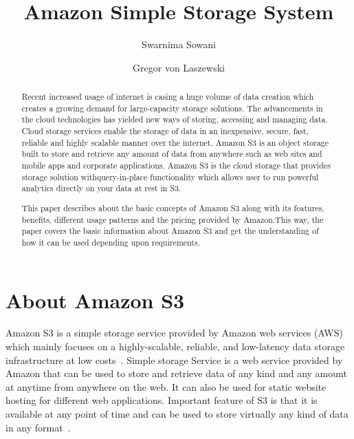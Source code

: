 
\title{Amazon Simple Storage System}


\author{Swarnima Sowani}

\author{Gregor von Laszewski}


\renewcommand{\shortauthors}{G. v. Laszewski}

\begin{abstract}

Recent increased usage of internet is casing a huge volume of data creation
which creates a growing demand for large-capacity storage solutions. The
advancements in the cloud technologies has yielded new ways of storing,
accessing and managing data. Cloud storage services enable the storage of data
in an inexpensive, secure, fast, reliable and highly scalable manner over the
internet. Amazon S3 is an object storage built to store and retrieve any amount
of data from anywhere such as web sites and mobile apps and corporate
applications. Amazon S3 is the cloud storage that provides storage solution
withquery-in-place functionality which allows user to run powerful analytics
directly on your data at rest in S3.

This paper describes about the basic concepts of Amazon S3 along with its
features, benefits, different usage patterns and the pricing provided by
Amazon.This way, the paper covers the basic information about Amazon S3 and get
the
understanding of how it can be used depending upon requirements.
\end{abstract}


\section{About Amazon S3}

Amazon S3 is a simple storage service provided by Amazon web services (AWS)
which mainly focuses on a highly-scalable, reliable, and low-latency data
storage infrastructure at low costs~\cite{hid-sp18-420-amazon-S3-FAQ}. Simple
storage Service is a web service provided by Amazon that can be used to store
and retrieve data of any kind and any amount at anytime from anywhere on the
web. It can also be used for static website hosting for different web
applications. Important feature of S3 is that it is available at any point of
time and can be used to store virtually any kind of data in any
format~\cite{hid-sp18-420-amazon-S3-FAQ}.

